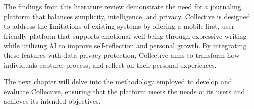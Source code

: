 The findings from this literature review demonstrate the need for a journaling platform that balances simplicity, intelligence, and privacy. Collective is designed to address the limitations of existing systems by offering a mobile-first, user-friendly platform that supports emotional well-being through expressive writing while utilizing AI to improve self-reflection and personal growth. By integrating these features with data privacy protection, Collective aims to transform how individuals capture, process, and reflect on their personal experiences.

The next chapter will delve into the methodology employed to develop and evaluate Collective, ensuring that the platform meets the needs of its users and achieves its intended objectives.
